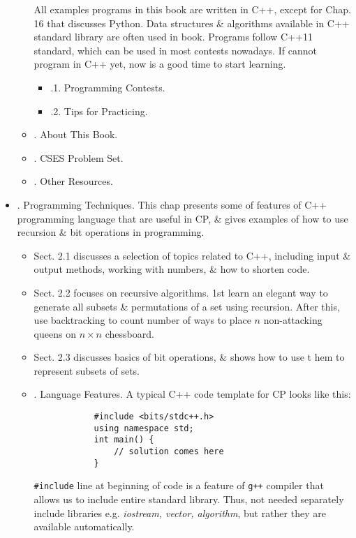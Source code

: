 \documentclass{article}
\begin{document}
\begin{itemize}
\begin{itemize}
		All examples programs in this book are written in C++, except for Chap. 16 that discusses Python. Data structures \& algorithms available in C++ standard library are often used in book. Programs follow C++11 standard, which can be used in most contests nowadays. If cannot program in C++ yet, now is a good time to start learning.
		\begin{itemize}
			\item {.1. Programming Contests.}
			\item {.2. Tips for Practicing.}
		\end{itemize}
		\item {. About This Book.}
		\item {. CSES Problem Set.}
		\item {. Other Resources.}
	\end{itemize}
	\item {. Programming Techniques.} This chap presents some of features of C++ programming language that are useful in CP, \& gives examples of how to use recursion \& bit operations in programming.
	\begin{itemize}
		\item Sect. 2.1 discusses a selection of topics related to C++, including input \& output methods, working with numbers, \& how to shorten code.
		\item Sect. 2.2 focuses on recursive algorithms. 1st learn an elegant way to generate all subsets \& permutations of a set using recursion. After this, use backtracking to count number of ways to place $n$ non-attacking queens on $n\times n$ chessboard.
		\item Sect. 2.3 discusses basics of bit operations, \& shows how to use t hem to represent subsets of sets.
	\end{itemize}
	
	\begin{itemize}
		\item {. Language Features.} A typical C++ code template for CP looks like this:
		\begin{verbatim}
			#include <bits/stdc++.h>
			using namespace std;
			int main() {
			    // solution comes here
			}
		\end{verbatim}
		\verb|#include| line at beginning of code is a feature of {\tt g++} compiler that allows us to include entire standard library. Thus, not needed separately include libraries e.g. {\it iostream, vector, algorithm}, but rather they are available automatically.
		

\end{itemize}
\end{itemize}
\end{document}
